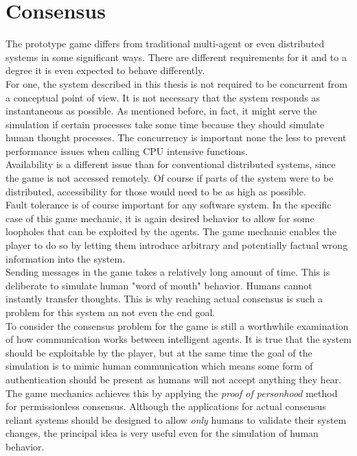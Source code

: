 \section{Consensus}
The prototype game differs from traditional multi-agent or even distributed systems in some significant ways. There are different requirements for it and to a degree it is even expected to behave differently.\\
For one, the system described in this thesis is not required to be concurrent from a conceptual point of view. It is not necessary that the system responds as instantaneous as possible. As mentioned before, in fact,  it might serve the simulation if certain processes take some time because they should simulate human thought processes. The concurrency is important none the less to prevent performance issues when calling CPU intensive functions.\\
Availability is a different issue than for conventional distributed systems, since the game is not accessed remotely. Of course if parts of the system were to be distributed, accessibility for those would need to be as high as possible.\\
Fault tolerance is of course important for any software system. In the specific case of this game mechanic, it is again desired behavior to allow for some loopholes that can be exploited by the agents. The game mechanic enables the player to do so by letting them introduce arbitrary and potentially factual wrong information into the system.\\
Sending messages in the game takes a relatively long amount of time. This is deliberate to simulate human "word of mouth" behavior. Humans cannot instantly transfer thoughts. This is why reaching actual consensus is such a problem for this system an not even the end goal.\\
To consider the consensus problem for the game is still a worthwhile examination of how communication works between intelligent agents. It is true that the system should be exploitable by the player, but at the same time the goal of the simulation is to mimic human communication which means some form of authentication should be present as humans will not accept anything they hear.\\
The game mechanics achieves this by applying the \textit{proof of personhood} method for permissionless consensus. Although the applications for actual consensus reliant systems should be designed to allow \textit{only} humans to validate their system changes, the principal idea is very useful even for the simulation of human behavior.\\
